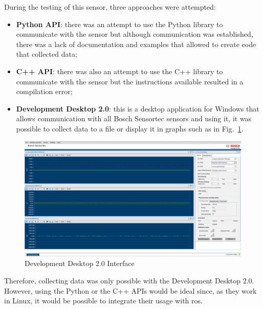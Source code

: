 During the testing of this sensor, three approaches were attempted:

\begin{itemize}
    \item \textbf{Python API}: there was an attempt to use the Python library to communicate with the sensor but although communication was established, there was a lack of documentation and examples that allowed to create code that collected data;
    \item \textbf{C++ API}: there was also an attempt to use the C++ library to communicate with the sensor but the instructions available resulted in a compilation error;
    \item \textbf{Development Desktop 2.0}: this is a desktop application for Windows that allows communication with all Bosch Sensortec sensors and using it, it was possible to collect data to a file or display it in graphs such as in Fig.~\ref{fig:dd2}.
\end{itemize}

\begin{figure}[H]
\centerline{\includegraphics[width=6in]{figs/boschDD2.PNG}}
\caption[Development Desktop 2.0 Interface]{Development Desktop 2.0 Interface \cite{BoschDD2}}
\label{fig:dd2}
\end{figure}

Therefore, collecting data was only possible with the Development Desktop 2.0. However, using the Python or the C++ APIs would be ideal since, as they work in Linux, it would be possible to integrate their usage with \acs{ros}.
